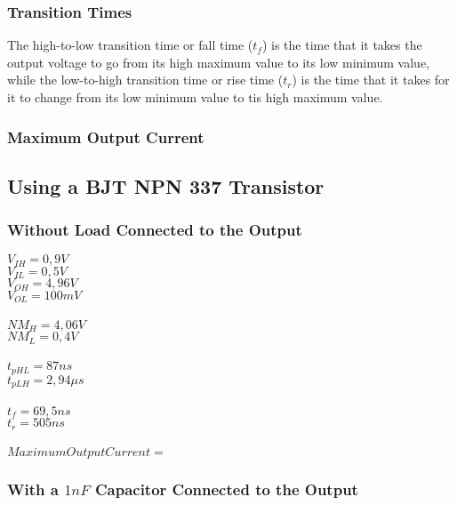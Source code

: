 \documentclass[a4paper,11pt]{report}
\begin{document}
\subsubsection{\color{red}Transition Times}
The high-to-low transition time or fall time ($t_{f}$) is the time that it takes the output voltage to go from its high maximum value to its low minimum value, while the low-to-high transition time or rise time ($t_{r}$) is the time that it takes for it to change from its low minimum value to tis high maximum value.


\subsubsection{\color{red}Maximum Output Current}

\subsection{\color{purple}Using a BJT NPN 337 Transistor}

\subsubsection{\color{red}Without Load Connected to the Output}
$V_{IH} = 0,9V$ \\
$V_{IL} = 0,5V$\\
$V_{OH} = 4,96V$\\
$V_{OL} = 100mV$\\ \\
$NM_{H} = 4,06V$\\ %
$NM_{L} = 0,4V$\\ \\ %
$t_{pHL} = 87ns$\\
$t_{pLH} = 2,94\mu s$\\ \\
$t_{f} = 69,5ns$\\
$t_{r} = 505ns$\\ \\
$Maximum Output Current = $ %

\subsubsection{\color{red}With a $1 nF$ Capacitor Connected to the Output}
\end{document}
